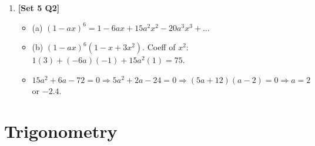 \documentclass[12pt, a4paper]{article} %
\begin{document}
\begin{enumerate}
    \item \textbf{[Set 5 Q2]}
    \begin{itemize}
        \item (a) $(1-ax)^6 = 1 - 6ax + 15a^2x^2 - 20a^3x^3 + \dots$
        \item (b) $(1-ax)^6(1-x+3x^2)$. Coeff of $x^2$: $1(3) + (-6a)(-1) + 15a^2(1) = 75$.
        \item $15a^2 + 6a - 72 = 0 \Rightarrow 5a^2 + 2a - 24 = 0 \Rightarrow (5a + 12)(a - 2) = 0 \Rightarrow a = 2$ or $-2.4$.
    \end{itemize}
\end{enumerate}

\section{Trigonometry}
\end{document}
